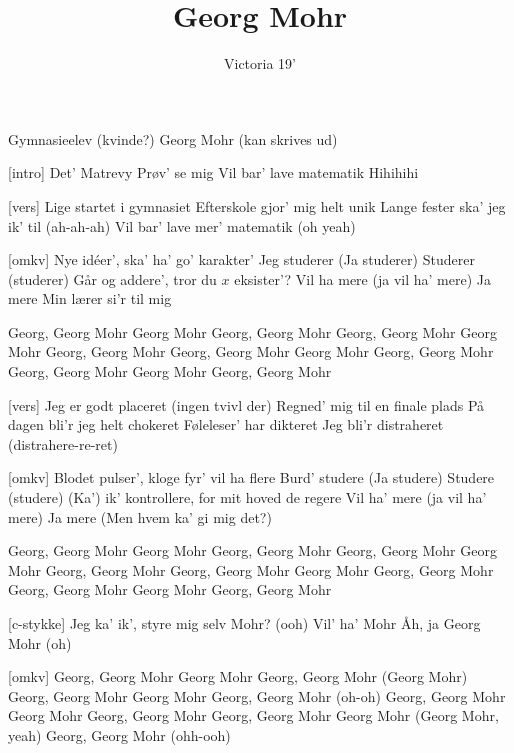 \documentclass[a4paper,11pt]{article}
\title{Georg Mohr}
\author{Victoria 19'}
\begin{document}
\maketitle

\begin{roles}
 Gymnasieelev (kvinde?)
 Georg Mohr (kan skrives ud)
\end{roles}

\begin{song}
[intro] Det' Matrevy
Prøv' se mig
Vil bar' lave matematik 
Hihihihi

[vers] Lige startet i gymnasiet
Efterskole gjor' mig helt unik
Lange fester ska' jeg ik' til (ah-ah-ah)
Vil bar' lave mer' matematik (oh yeah)

[omkv] Nye idéer', ska' ha' go' karakter'
Jeg studerer (Ja studerer)
Studerer (studerer)
Går og addere', tror du $x$ eksister'?
Vil ha mere (ja vil ha' mere)
Ja mere
Min lærer si'r til mig

Georg, Georg Mohr
Georg Mohr
Georg, Georg Mohr
Georg, Georg Mohr
Georg Mohr
Georg, Georg Mohr
Georg, Georg Mohr
Georg Mohr
Georg, Georg Mohr
Georg, Georg Mohr
Georg Mohr
Georg, Georg Mohr

[vers] Jeg er godt placeret (ingen tvivl der)
Regned' mig til en finale plads
På dagen bli'r jeg helt chokeret
Føleleser' har dikteret
Jeg bli'r distraheret (distrahere-re-ret)

[omkv] Blodet pulser', kloge fyr' vil ha flere
Burd' studere (Ja studere)
Studere (studere)
(Ka') ik' kontrollere, for mit hoved de regere  
Vil ha' mere (ja vil ha' mere)
Ja mere
(Men hvem ka' gi mig det?) 

Georg, Georg Mohr
Georg Mohr
Georg, Georg Mohr
Georg, Georg Mohr
Georg Mohr
Georg, Georg Mohr
Georg, Georg Mohr
Georg Mohr
Georg, Georg Mohr
Georg, Georg Mohr
Georg Mohr
Georg, Georg Mohr

[c-stykke] Jeg ka' ik', styre mig selv 
Mohr? (ooh) 
Vil' ha' Mohr
Åh, ja Georg Mohr (oh)


[omkv] Georg, Georg Mohr
Georg Mohr
Georg, Georg Mohr (Georg Mohr)
Georg, Georg Mohr
Georg Mohr
Georg, Georg Mohr (oh-oh)
Georg, Georg Mohr
Georg Mohr
Georg, Georg Mohr
Georg, Georg Mohr
Georg Mohr (Georg Mohr, yeah)
Georg, Georg Mohr (ohh-ooh)


\end{song}
\end{document}
